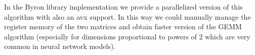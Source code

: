 \documentclass{standalone}
\begin{document}
In the Byron library implementation we provide a parallelized version of this algorithm with also an \textsf{avx} support.
In this way we could manually manage the register memory of the two matrices and obtain faster version of the GEMM algorithm (especially for dimensions proportional to powers of 2 which are very common in neural network models).
\end{document}
